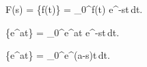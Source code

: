 

F(s)  = \left\{f(t)\right\} = \int_0^\infty f(t) e^{-st}\,dt.


\left\{e^{at}\right\} = \int_0^\infty e^{at} e^{-st}\,dt.

\left\{e^{at}\right\} = \int_0^\infty e^{(a-s)t}\,dt.


